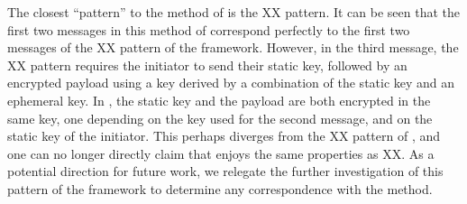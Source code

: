 {The closest \mNoise{} ``pattern'' to the \mStatStat{} method of \mEdhoc{} is the
XX pattern. It can be seen that the first two messages in this method of
\mEdhoc{} correspond perfectly to the first two messages of the XX pattern of
the \mNoise{} framework. However, in the third message, the XX pattern requires
the initiator to send their static key, followed by an encrypted payload using a
key derived by a combination of the static key and an ephemeral key. In
\mEdhoc{}, the static key and the payload are both encrypted in the same key, one depending on the key used for the second message, and on the static key of the initiator.
This perhaps diverges from the XX pattern of \mNoise{}, and one can no longer
directly claim that \mEdhoc{} enjoys the same properties as XX. As a potential
direction for future work, we relegate the further investigation of this pattern
of the \mNoise{} framework to {determine any} correspondence with the
\mStatStat{} method.

}
